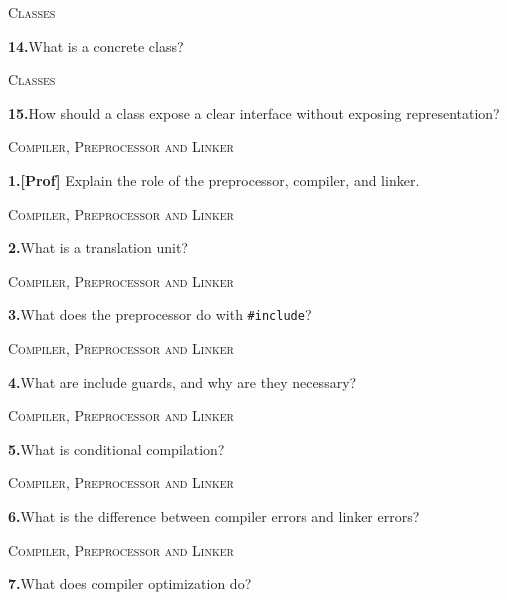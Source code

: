 \documentclass[11pt,a4paper]{article}
\newenvironment{questionblock}{%
  \begin{minipage}[t][0.455\textheight][t]{\textwidth}%
  \raggedright\small
}{%
  \vfill
  \end{minipage}%
}
\newcommand{\sectionlabel}[1]{\textsc{#1}\par\vspace{0.35em}}
\newcommand{\questionnumber}[1]{\textbf{#1.}\enspace}
\begin{document}
\newpage
\begin{questionblock}
\sectionlabel{Classes}
\questionnumber{14}What is a concrete class?\par
\end{questionblock}
\vspace*{0.04\textheight}
\begin{questionblock}
\sectionlabel{Classes}
\questionnumber{15}How should a class expose a clear interface without exposing representation?\par

\end{questionblock}
\newpage
\begin{questionblock}
\sectionlabel{Compiler, Preprocessor and Linker}
\questionnumber{1}\textbf{[Prof]} Explain the role of the preprocessor, compiler, and linker.\par
\end{questionblock}
\vspace*{0.04\textheight}
\begin{questionblock}
\sectionlabel{Compiler, Preprocessor and Linker}
\questionnumber{2}What is a translation unit?\par
\end{questionblock}
\newpage
\begin{questionblock}
\sectionlabel{Compiler, Preprocessor and Linker}
\questionnumber{3}What does the preprocessor do with \verb|#include|?\par
\end{questionblock}
\vspace*{0.04\textheight}
\begin{questionblock}
\sectionlabel{Compiler, Preprocessor and Linker}
\questionnumber{4}What are include guards, and why are they necessary?\par
\end{questionblock}
\newpage
\begin{questionblock}
\sectionlabel{Compiler, Preprocessor and Linker}
\questionnumber{5}What is conditional compilation?\par
\end{questionblock}
\vspace*{0.04\textheight}
\begin{questionblock}
\sectionlabel{Compiler, Preprocessor and Linker}
\questionnumber{6}What is the difference between compiler errors and linker errors?\par
\end{questionblock}
\newpage
\begin{questionblock}
\sectionlabel{Compiler, Preprocessor and Linker}
\questionnumber{7}What does compiler optimization do?\par
\end{questionblock}
\end{document}
